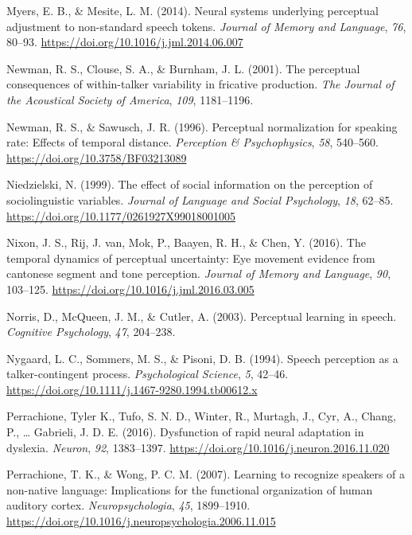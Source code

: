 \documentclass[
  11pt,
  english,
  man,floatsintext]{apa6}
\newlength{\cslhangindent}
\newlength{\cslentryspacingunit} %
\newenvironment{CSLReferences}[2] %
 {%
  \setlength{\parindent}{0pt}
  \ifodd #1
  \let\oldpar\par
  \def\par{\hangindent=\cslhangindent\oldpar}
  \fi
  \setlength{\parskip}{#2\cslentryspacingunit}
 }%
 {}
\begin{document}
\begin{CSLReferences}{1}{0}
\leavevmode{}%
Myers, E. B., \& Mesite, L. M. (2014). Neural systems underlying perceptual adjustment to non-standard speech tokens. \emph{Journal of Memory and Language}, \emph{76}, 80--93. \url{https://doi.org/10.1016/j.jml.2014.06.007}

\leavevmode{}%
Newman, R. S., Clouse, S. A., \& Burnham, J. L. (2001). The perceptual consequences of within-talker variability in fricative production. \emph{The Journal of the Acoustical Society of America}, \emph{109}, 1181--1196.

\leavevmode{}%
Newman, R. S., \& Sawusch, J. R. (1996). Perceptual normalization for speaking rate: Effects of temporal distance. \emph{Perception \& Psychophysics}, \emph{58}, 540--560. \url{https://doi.org/10.3758/BF03213089}

\leavevmode{}%
Niedzielski, N. (1999). The effect of social information on the perception of sociolinguistic variables. \emph{Journal of Language and Social Psychology}, \emph{18}, 62--85. \url{https://doi.org/10.1177/0261927X99018001005}

\leavevmode{}%
Nixon, J. S., Rij, J. van, Mok, P., Baayen, R. H., \& Chen, Y. (2016). The temporal dynamics of perceptual uncertainty: Eye movement evidence from cantonese segment and tone perception. \emph{Journal of Memory and Language}, \emph{90}, 103--125. \url{https://doi.org/10.1016/j.jml.2016.03.005}

\leavevmode{}%
Norris, D., McQueen, J. M., \& Cutler, A. (2003). Perceptual learning in speech. \emph{Cognitive Psychology}, \emph{47}, 204--238.

\leavevmode{}%
Nygaard, L. C., Sommers, M. S., \& Pisoni, D. B. (1994). Speech perception as a talker-contingent process. \emph{Psychological Science}, \emph{5}, 42--46. \url{https://doi.org/10.1111/j.1467-9280.1994.tb00612.x}

\leavevmode{}%
Perrachione, Tyler K., Tufo, S. N. D., Winter, R., Murtagh, J., Cyr, A., Chang, P., \ldots{} Gabrieli, J. D. E. (2016). Dysfunction of rapid neural adaptation in dyslexia. \emph{Neuron}, \emph{92}, 1383--1397. \url{https://doi.org/10.1016/j.neuron.2016.11.020}

\leavevmode{}%
Perrachione, T. K., \& Wong, P. C. M. (2007). Learning to recognize speakers of a non-native language: Implications for the functional organization of human auditory cortex. \emph{Neuropsychologia}, \emph{45}, 1899--1910. \url{https://doi.org/10.1016/j.neuropsychologia.2006.11.015}


\end{CSLReferences}
\end{document}
